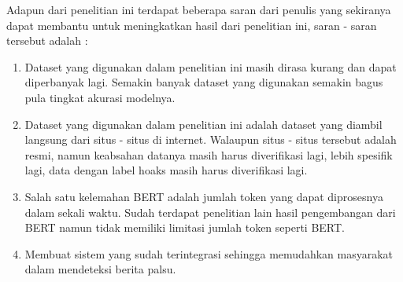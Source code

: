 Adapun dari penelitian ini terdapat beberapa saran dari penulis yang sekiranya dapat membantu untuk meningkatkan hasil dari penelitian ini, saran - saran tersebut adalah :

\begin{enumerate}[nolistsep]

  \item Dataset yang digunakan dalam penelitian ini masih dirasa kurang dan dapat diperbanyak lagi. Semakin banyak dataset yang digunakan semakin bagus pula tingkat akurasi modelnya.
  \item Dataset yang digunakan dalam penelitian ini adalah dataset yang diambil langsung dari situs - situs di internet. Walaupun situs - situs tersebut adalah resmi, namun keabsahan datanya masih harus diverifikasi lagi, lebih spesifik lagi, data dengan label hoaks masih harus diverifikasi lagi.
  \item Salah satu kelemahan BERT adalah jumlah token yang dapat diprosesnya dalam sekali waktu. Sudah terdapat penelitian lain hasil pengembangan dari BERT namun tidak memiliki limitasi jumlah token seperti BERT.
  \item Membuat sistem yang sudah terintegrasi sehingga memudahkan masyarakat dalam mendeteksi berita palsu.

\end{enumerate}

